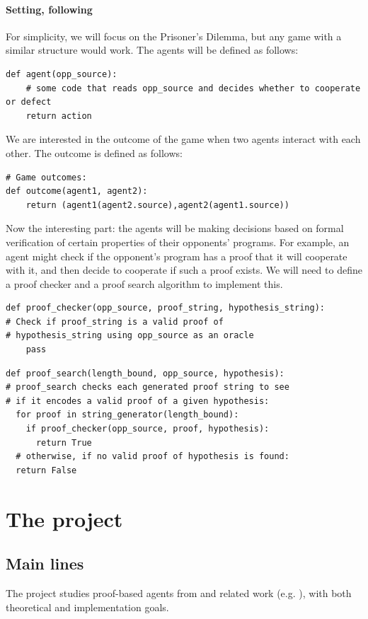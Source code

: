 \documentclass{article}
\begin{document}
\paragraph{Setting, following \cite{critch2022cooperativeuncooperativeinstitutiondesigns}} 
For simplicity, we will focus on the Prisoner's Dilemma, but any game with a similar structure would work. The agents will be defined as follows:

\begin{verbatim}
def agent(opp_source):
    # some code that reads opp_source and decides whether to cooperate or defect
    return action
\end{verbatim}

We are interested in the outcome of the game when two agents interact with each other. The outcome is defined as follows:

\begin{verbatim}
# Game outcomes:
def outcome(agent1, agent2):
    return (agent1(agent2.source),agent2(agent1.source))
\end{verbatim}

Now the interesting part: the agents will be making decisions based on formal verification of certain properties of their opponents' programs. For example, an agent might check if the opponent's program has a proof that it will cooperate with it, and then decide to cooperate if such a proof exists.
We will need to define a proof checker and a proof search algorithm to implement this.

\begin{verbatim}
def proof_checker(opp_source, proof_string, hypothesis_string):
# Check if proof_string is a valid proof of
# hypothesis_string using opp_source as an oracle
    pass
\end{verbatim}

\begin{verbatim}
def proof_search(length_bound, opp_source, hypothesis):
# proof_search checks each generated proof string to see
# if it encodes a valid proof of a given hypothesis:
  for proof in string_generator(length_bound):
    if proof_checker(opp_source, proof, hypothesis):
      return True
  # otherwise, if no valid proof of hypothesis is found:
  return False
\end{verbatim}

\section{The project}
\subsection{Main lines}
The project studies proof-based agents from \cite{critch2022cooperativeuncooperativeinstitutiondesigns} and related work (e.g. \cite{sistla2025evaluatingllmsopensourcegames}), with both theoretical and implementation goals.
\end{document}
